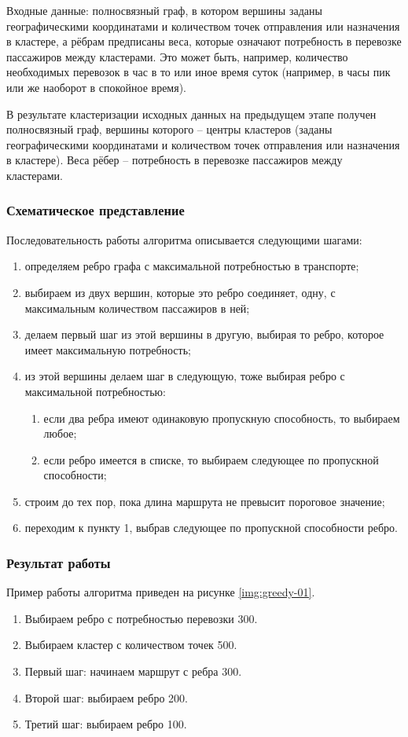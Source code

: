 Входные данные: полносвязный граф, в котором вершины заданы географическими координатами и количеством 
точек отправления или назначения в кластере, а рёбрам предписаны веса, которые означают потребность в 
перевозке пассажиров между кластерами. Это может быть, например, количество необходимых перевозок в час в то 
или иное время суток (например, в часы пик или же наоборот в спокойное время).

В результате кластеризации исходных данных на предыдущем этапе получен полносвязный граф, вершины 
которого -- центры кластеров (заданы географическими координатами и количеством точек отправления или 
назначения в кластере). Веса рёбер -- потребность в перевозке пассажиров между кластерами. 

\subsubsection{Схематическое представление}
Последовательность работы алгоритма описывается следующими шагами:
\begin{enumerate}
    \item определяем ребро графа с максимальной потребностью в транспорте;
    \item выбираем из двух вершин, которые это ребро соединяет, одну, с максимальным количеством 
        пассажиров в ней;
    \item делаем первый шаг из этой вершины в другую, выбирая то ребро, которое имеет максимальную 
        потребность;
    \item из этой вершины делаем шаг в следующую, тоже выбирая ребро с максимальной потребностью:
    \begin{enumerate}
        \item если два ребра имеют одинаковую пропускную способность, то выбираем любое;
        \item если ребро имеется в списке, то выбираем следующее по пропускной способности;
    \end{enumerate}
    \item строим до тех пор, пока длина маршрута не превысит пороговое значение;
    \item переходим к пункту 1, выбрав следующее по пропускной способности ребро.
\end{enumerate}

\subsubsection{Результат работы}
Пример работы алгоритма приведен на рисунке \ref{img:greedy-01}.
\begin{enumerate}
    \item Выбираем ребро с потребностью перевозки 300.
    \item Выбираем кластер с количеством точек 500.
    \item Первый шаг: начинаем маршрут с ребра 300.
    \item Второй шаг: выбираем ребро 200.
    \item Третий шаг: выбираем ребро 100.
\end{enumerate}

